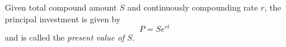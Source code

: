 \begin{definition}
    Given total compound amount \(S\) and continuously compounding rate \(r\), the principal investment is given by \[P = Se^{rt}\] and is called the \emph{present value of} \(S.\)
\end{definition}